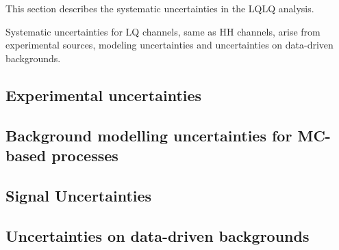 This section describes the systematic uncertainties in the LQLQ analysis.

Systematic uncertainties for LQ channels, same as HH channels, arise from experimental sources, modeling uncertainties and uncertainties on data-driven backgrounds. 

\subsection{Experimental uncertainties}
\label{sec:LQ_systematics_experimental}



\subsection{Background modelling uncertainties for MC-based processes}
\label{sec:LQ_systematics_backgroundmodelling}



\subsection{Signal Uncertainties}
\label{sec:LQ_signal_uncertanties}



\subsection{Uncertainties on data-driven backgrounds}
\label{sec:LQ_systematics_datadriven}


